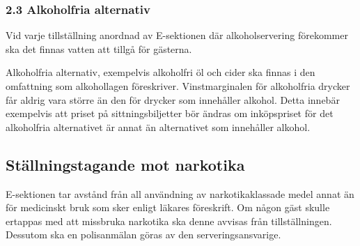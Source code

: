 \documentclass[10pt]{article}
\begin{document}
\subsubsection*{2.3 Alkoholfria alternativ}
Vid varje tillställning anordnad av E-sektionen där alkoholservering förekommer ska det finnas vatten att tillgå för gästerna.

Alkoholfria alternativ, exempelvis alkoholfri öl och cider ska finnas i den omfattning som alkohollagen föreskriver. Vinstmarginalen för alkoholfria drycker får aldrig vara större än den för drycker som innehåller alkohol. Detta innebär exempelvis att priset på sittningsbiljetter bör ändras om inköpspriset för det alkoholfria alternativet är annat än alternativet som innehåller alkohol.

\subsection*{Ställningstagande mot narkotika}
E-sektionen tar avstånd från all användning av narkotikaklassade medel annat än för medicinskt bruk som sker enligt läkares föreskrift. Om någon gäst skulle ertappas med att missbruka narkotika ska denne avvisas från tillställningen. Dessutom ska en polisanmälan göras av den serveringsansvarige.
\end{document}
